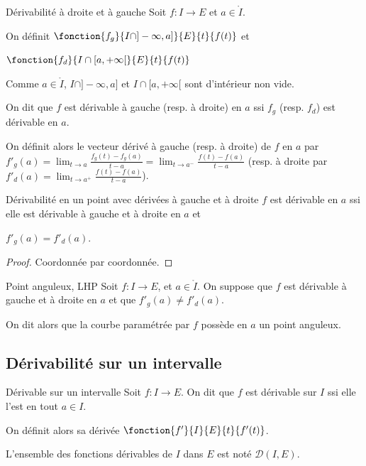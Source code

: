 \begin{definition}{Dérivabilité à droite et à gauche}{}
    Soit $f : I \to E$ et $a \in \mathring I$. 

    \avspace On définit $\fonction{f_g}{I \cap ]-\infty, a]}{E}{t}{f(t)}$ et 

    \avspace $\fonction{f_d}{I \cap [a, +\infty[}{E}{t}{f(t)}$

    Comme $a \in \mathring I$, $I \cap ]-\infty, a]$ et $I \cap [a, +\infty[$ 
    sont d'intérieur non vide.

    On dit que $f$ est dérivable à gauche (resp. à droite) en $a$ ssi $f_g$ 
    (resp. $f_d$) est dérivable en $a$.

    On définit alors le vecteur dérivé à gauche (resp. à droite) de $f$ en $a$ par 
    $\displaystyle f'_g(a) = \lim_{t \to a} \frac{f_g(t) - f_g(a)}{t-a} = \lim_{t \to a^-} \frac{f(t) - f(a)}{t-a}$
    (resp. à droite par $\displaystyle f'_d(a) = \lim_{t \to a^+} \frac{f(t) - f(a)}{t-a}$).                                                    
\end{definition}

\begin{proposition}{Dérivabilité en un point avec dérivées à gauche et à droite}{}
    $f$ est dérivable en $a$ ssi elle est dérivable à gauche et à droite en $a$ et
    
    $f'_g(a) = f'_d(a)$. 
\end{proposition}

\begin{proof}
    Coordonnée par coordonnée.
\end{proof}

\begin{definition}{Point anguleux, LHP}{}
    Soit $f : I \to E$, et $a \in \mathring{I }$. 
    On suppose que $f$ est dérivable à gauche et à droite en $a$ et que 
    $f'_g(a) \neq f'_d(a)$.

    On dit alors que la courbe paramétrée par $f$ possède en $a$ un point anguleux.
\end{definition}

\subsection{Dérivabilité sur un intervalle}

\begin{definition}{Dérivable sur un intervalle}{}
    Soit $f : I \to E$. On dit que $f$ est dérivable sur $I$ ssi elle l'est en tout $a \in I$. 

    On définit alors sa dérivée $\fonction{f'}{I}{E}{t}{f'(t)}$. 

    L'ensemble des fonctions dérivables de $I$ dans $E$ est noté $\mathscr D(I, E)$.
\end{definition}

